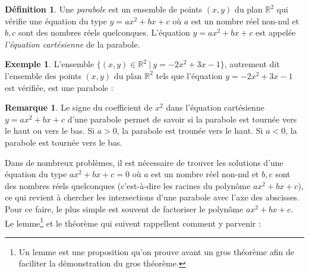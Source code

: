 \documentclass[a4paper,13pt]{scrreprt}
\theoremstyle{plain}
\theoremstyle{definition}
\newtheorem{déf}[subsection]{Définition}
\newtheorem{exe}[subsection]{Exemple}
\newtheorem{rema}[subsection]{Remarque}
\newcommand{\rr}{\mathbb{R}}
\begin{document}
\begin{déf}
	Une \emph{parabole} est un ensemble de points $(x,y)$ du plan ${\rr}^2$ qui vérifie une équation du type $y = ax^2 + bx + c$ où $a$ est un nombre réel non-nul et $b,c$ sont des nombres réels quelconques. L'équation $y = ax^2 + bx + c$ est appelée \emph{l'équation cartésienne} de la parabole.
\end{déf}
\newpage
\begin{exe}
	L'ensemble $\{(x,y) \in {\rr}^2 ~|~ y = -2x^2 + 3x -1\}$, autrement dit l'ensemble des points $(x,y)$ du plan ${\rr}^2$ tels que l'équation $y = -2x^2 + 3x -1$ est vérifiée, est une parabole :
	\begin{center}
	\end{center}
\end{exe}
\begin{rema}
	Le signe du coefficient de $x^2$ dans l'équation cartésienne $y=ax^2 + bx +c$ d'une parabole permet de savoir si la parabole est tournée vers le haut ou vers le bas. Si $a>0$, la parabole est trounée vers le haut. Si $a<0$, la parabole est tournée vers le bas.
\end{rema}
Dans de nombreux problèmes, il est nécessaire de trouver les solutions d'une équation du type $ax^2 + bx +c = 0$ où $a$ est un nombre réel non-nul et $b,c$ sont des nombres réels quelconques (c'est-à-dire les racines du polynôme $ax^2+bx+c$), ce qui revient à chercher les intersections d'une parabole avec l'axe des abscisses. Pour ce faire, le plus simple est souvent de factoriser le polynôme $ax^2 + bx +c$. Le lemme\footnote{Un lemme est une proposition qu'on prouve avant un gros théorème afin de faciliter la démonstration du gros théorème.} et le théorème qui suivent rappellent comment y parvenir :
\end{document}
